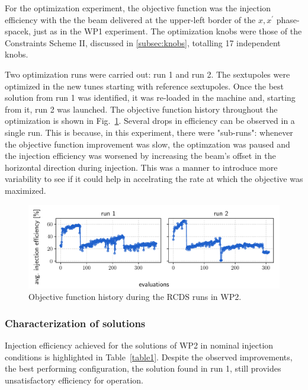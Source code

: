 For the optimization experiment, the objective function was the injection efficiency with the the beam delivered at the upper-left border of the $x,x^\prime$ phase-spacek, just as in the WP1 experiment. The optimization knobs were those of the Constraints Scheme II, discussed in \ref{subsec:knobs}, totalling 17 independent knobs. 

Two optimization runs were carried out: run 1 and run 2. The sextupoles were optimized in the new tunes starting with reference sextupoles. Once the best solution from run 1 was identified, it was re-loaded in the machine and, starting from it, run 2 was launched. The objective function history throughout the optimization is shown in Fig.~\ref{fig:wp_2_history}. Several drops in efficiency can be observed in a single run. This is because, in this experiment, there were "sub-runs": whenever the objective function improvement was slow, the optimzation was paused and the injection efficiency was worsened by increasing the beam's offset in the horizontal direction during injection. This was a manner to introduce more variability to see if it could help in accelrating the rate at which the objective was maximized.
\begin{figure}
    \includegraphics[width=\columnwidth]{Images/wp2_objfunc_hist.pdf}
    \caption[Objective function history during the RCDS runs in WP2.]{Objective function history during the RCDS runs in WP2.}
    \label{fig:wp_2_history}
\end{figure}
\subsubsection{Characterization of solutions}
Injection efficiency  achieved for the solutions of WP2 in nominal injection conditions is highlighted in Table~\ref{table1}. Despite the observed improvements, the best performing configuration, the solution found in run 1, still provides unsatisfactory efficiency for operation.

